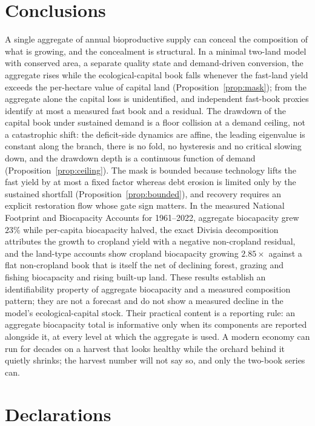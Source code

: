 \documentclass[preprint,12pt,authoryear]{elsarticle}
\begin{document}
\section{Conclusions}\label{sec:conclusions}

A single aggregate of annual bioproductive supply can conceal the composition of what is growing, and the concealment is structural. In a minimal two-land model with conserved area, a separate quality state and demand-driven conversion, the aggregate rises while the ecological-capital book falls whenever the fast-land yield exceeds the per-hectare value of capital land (Proposition~\ref{prop:mask}); from the aggregate alone the capital loss is unidentified, and independent fast-book proxies identify at most a measured fast book and a residual. The drawdown of the capital book under sustained demand is a floor collision at a demand ceiling, not a catastrophic shift: the deficit-side dynamics are affine, the leading eigenvalue is constant along the branch, there is no fold, no hysteresis and no critical slowing down, and the drawdown depth is a continuous function of demand (Proposition~\ref{prop:ceiling}). The mask is bounded because technology lifts the fast yield by at most a fixed factor whereas debt erosion is limited only by the sustained shortfall (Proposition~\ref{prop:bounded}), and recovery requires an explicit restoration flow whose gate sign matters. In the measured National Footprint and Biocapacity Accounts for 1961--2022, aggregate biocapacity grew $23\%$ while per-capita biocapacity halved, the exact Divisia decomposition attributes the growth to cropland yield with a negative non-cropland residual, and the land-type accounts show cropland biocapacity growing $2.85\times$ against a flat non-cropland book that is itself the net of declining forest, grazing and fishing biocapacity and rising built-up land. These results establish an identifiability property of aggregate biocapacity and a measured composition pattern; they are not a forecast and do not show a measured decline in the model's ecological-capital stock. Their practical content is a reporting rule: an aggregate biocapacity total is informative only when its components are reported alongside it, at every level at which the aggregate is used. A modern economy can run for decades on a harvest that looks healthy while the orchard behind it quietly shrinks; the harvest number will not say so, and only the two-book series can.

\section*{Declarations}
\end{document}
